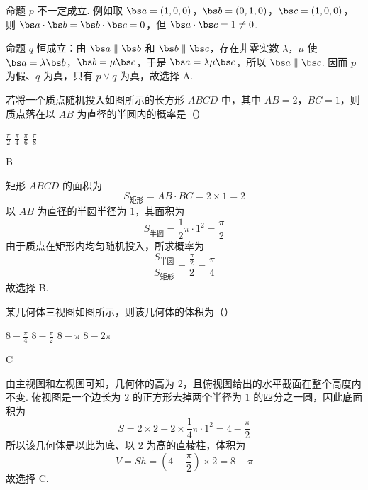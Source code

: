 \begin{solution}
命题 \(p\) 不一定成立. 例如取
\(\bs a=(1,0,0)\)，\(\bs b=(0,1,0)\)，\(\bs c=(1,0,0)\)，则
\(\bs a\cdot\bs b=\bs b\cdot\bs c=0\)，但 \(\bs a\cdot\bs c=1\neq0\).

命题 \(q\) 恒成立：由 \(\bs a\parallel\bs b\) 和 \(\bs b\parallel\bs c\)，存在非零实数 \(\lambda\)，\(\mu\) 使 \(\bs a=\lambda\bs b\)，\(\bs b=\mu\bs c\)，于是 \(\bs a=\lambda\mu\bs c\)，所以 \(\bs a\parallel\bs c\). 因而 \(p\) 为假、\(q\) 为真，只有 \(p\vee q\) 为真，故选择 A.
\end{solution}

\begin{problem}
若将一个质点随机投入如图所示的长方形 \(ABCD\) 中，其中 \(AB = 2\)，\(BC = 1\)，则质点落在以 \(AB\) 为直径的半圆内的概率是（\quad）


\choices
    {\(\frac{\pi}{2}\)}
    {\(\frac{\pi}{4}\)}
    {\(\frac{\pi}{6}\)}
    {\(\frac{\pi}{8}\)}
\end{problem}

\begin{answer}
B
\end{answer}

\begin{solution}
矩形 \(ABCD\) 的面积为
\[
S_{\text{矩形}}=AB\cdot BC=2\times1=2
\]
以 \(AB\) 为直径的半圆半径为 \(1\)，其面积为
\[
S_{\text{半圆}}=\frac{1}{2}\pi\cdot1^{2}=\frac{\pi}{2}
\]
由于质点在矩形内均匀随机投入，所求概率为
\[
\frac{S_{\text{半圆}}}{S_{\text{矩形}}}=\frac{\frac{\pi}{2}}{2}=\frac{\pi}{4}
\]
故选择 B.
\end{solution}

\begin{problem}
某几何体三视图如图所示，则该几何体的体积为（\quad）


\choices
    {\(8 - \frac{\pi}{4}\)}
    {\(8 - \frac{\pi}{2}\)}
    {\(8 - \pi\)}
    {\(8 - 2\pi\)}
\end{problem}

\begin{answer}
C
\end{answer}

\begin{solution}
由主视图和左视图可知，几何体的高为 \(2\)，且俯视图给出的水平截面在整个高度内不变. 俯视图是一个边长为 \(2\) 的正方形去掉两个半径为 \(1\) 的四分之一圆，因此底面积为
\[
S=2\times2-2\times\frac{1}{4}\pi\cdot1^{2}=4-\frac{\pi}{2}
\]
所以该几何体是以此为底、以 \(2\) 为高的直棱柱，体积为
\[
V=Sh=\left(4-\frac{\pi}{2}\right)\times2=8-\pi
\]
故选择 C.
\end{solution}

